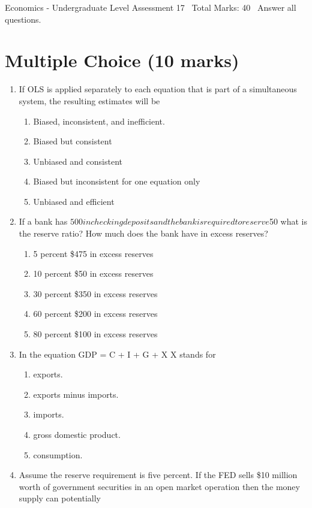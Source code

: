 \documentclass[12pt]{article}
\begin{document}
\begin{center}
Economics - Undergraduate Level Assessment 17 \
Total Marks: 40 \
Answer all questions.
\end{center}

\section*{Multiple Choice (10 marks)}
\begin{enumerate}[label=\arabic*.]
\item If OLS is applied separately to each equation that is part of a simultaneous system, the resulting estimates will be
\begin{enumerate}[label=(\alph*)]
    \item Biased, inconsistent, and inefficient.
    \item Biased but consistent
    \item Unbiased and consistent
    \item Biased but inconsistent for one equation only
    \item Unbiased and efficient
\end{enumerate}
\item If a bank has $500 in checking deposits and the bank is required to reserve $50 what is the reserve ratio? How much does the bank have in excess reserves?
\begin{enumerate}[label=(\alph*)]
    \item 5 percent \$475 in excess reserves
    \item 10 percent \$50 in excess reserves
    \item 30 percent \$350 in excess reserves
    \item 60 percent \$200 in excess reserves
    \item 80 percent \$100 in excess reserves
\end{enumerate}
\item In the equation GDP = C + I + G + X X stands for
\begin{enumerate}[label=(\alph*)]
    \item exports.
    \item exports minus imports.
    \item imports.
    \item gross domestic product.
    \item consumption.
\end{enumerate}
\item Assume the reserve requirement is five percent. If the FED sells \$10 million worth of government securities in an open market operation then the money supply can potentially

\end{enumerate}
\end{document}
